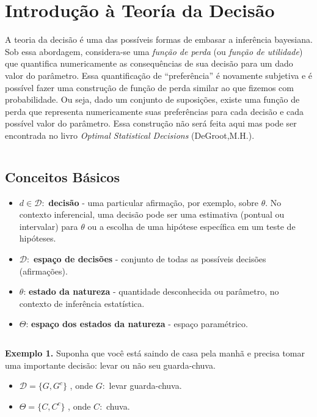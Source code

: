 \documentclass[
]{book}
\begin{document}
\(~\)

\hypertarget{TeoDec}{%
\chapter{Introdução à Teoría da Decisão}\label{TeoDec}}

A teoria da decisão é uma das possíveis formas de embasar a inferência bayesiana. Sob essa abordagem, considera-se uma \emph{função de perda} (ou \emph{função de utilidade}) que quantifica numericamente as consequências de sua decisão para um dado valor do parâmetro. Essa quantificação de ``preferência'' é novamente subjetiva e é possível fazer uma construção de função de perda similar ao que fizemos com probabilidade. Ou seja, dado um conjunto de suposições, existe uma função de perda que representa numericamente suas preferências para cada decisão e cada possível valor do parâmetro. Essa construção não será feita aqui mas pode ser encontrada no livro \emph{Optimal Statistical Decisions} (DeGroot,M.H.).

\(~\)

\hypertarget{BasDec}{%
\section{Conceitos Básicos}\label{BasDec}}

\begin{itemize}
\item
  \(d \in \mathcal{D}:\) \textbf{decisão} - uma particular afirmação, por exemplo, sobre \(\theta\). No contexto inferencial, uma decisão pode ser uma estimativa (pontual ou intervalar) para \(\theta\) ou a escolha de uma hipótese específica em um teste de hipóteses.
\item
  \(\mathcal{D}:\) \textbf{espaço de decisões} - conjunto de todas as possíveis decisões (afirmações).
\item
  \(\theta\): \textbf{estado da natureza} - quantidade desconhecida ou parâmetro, no contexto de inferência estatística.
\item
  \(\Theta\): \textbf{espaço dos estados da natureza} - espaço paramétrico.
\end{itemize}

\(~\)

\textbf{Exemplo 1.}
Suponha que você está saindo de casa pela manhã e precisa tomar uma importante decisão: levar ou não seu guarda-chuva.

\begin{itemize}
\item
  \(\mathcal{D}=\{G,G^c\}\) , onde \(G:\) levar guarda-chuva.
\item
  \(\Theta=\{C,C^c\}\) , onde \(C:\) chuva.
\end{itemize}
\end{document}
